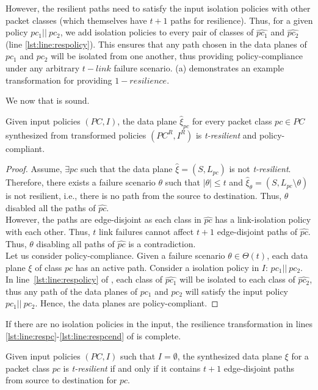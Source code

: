 However, the resilient paths need to satisfy the input isolation policies with other 
packet classes (which themselves have $t+1$ paths for resilience). Thus, for a 
given policy $pc_1 || ~pc_2$, we add isolation policies to every pair of 
classes of $\hat{pc_1}$ and $\hat{pc_2}$ (line \ref{lst:line:respolicy}). This ensures that any path 
chosen in the data planes of $pc_1$ and $pc_2$ will be isolated from one 
another, thus providing policy-compliance under any arbitrary $t-link$ failure
scenario. (a) demonstrates an example transformation for providing $1-resilience$. 

\noindent We now that  is sound.
\begin{theorem}[Soundness]
Given input policies $(PC, I)$, 
the data plane $\hat{\xi}_{pc}$ for every packet class $pc \in PC$
 synthesized from
transformed policies $(PC^R, I^R)$  is \emph{t-resilient} 
	and policy-compliant. 
\end{theorem}
\iffull
\begin{proof}
		Assume, $\exists pc$ such that the data plane $\hat{\xi} = (S, L_{pc})$
		is not \emph{t-resilient}. 
		Therefore, there exists a failure scenario $\theta$ such that $|\theta| \leq t$ 
		and $\hat{\xi}_\theta = (S, L_{pc} \setminus \theta)$ 
		is not resilient, i.e., there is no path from the source to destination. 
		Thus, $\theta$ disabled all the paths of $\hat{pc}$. \\
		However, the paths are
		edge-disjoint as each class in $\hat{pc}$ has a link-isolation policy with each 
		other. Thus, $t$ link failures cannot affect $t+1$ 
		edge-disjoint paths of $\hat{pc}$. Thus, $\theta$ disabling all paths of
		$\hat{pc}$ is a contradiction. \\
		Let us consider policy-compliance. Given a failure scenario $\theta \in \Theta(t)$, each data plane $\xi$ of class $pc$ has an active path. Consider a isolation policy in $I$: $pc_1 || \ pc_2$. In line~\ref{lst:line:respolicy} of , each class of $\hat{pc_1}$ will be isolated to
		each class of $\hat{pc_2}$, thus any path of the data planes of $pc_1$ and
		$pc_2$ will satisfy the input policy $pc_1 || \ pc_2$. Hence, the data planes 
		are policy-compliant. 
	\end{proof}
	\fi
\noindent If there are no isolation policies in the input, the resilience transformation in lines 
\ref{lst:line:respc}-\ref{lst:line:respcend} of  is complete.
\begin{theorem}[Completeness]
Given input policies $(PC,I)$ such that $I=\emptyset$,
the synthesized data plane $\xi$ for a packet class $pc$  
is \emph{t-resilient} if and only if it 
contains $t + 1$ edge-disjoint paths from source to destination
for $pc$.
\end{theorem}

